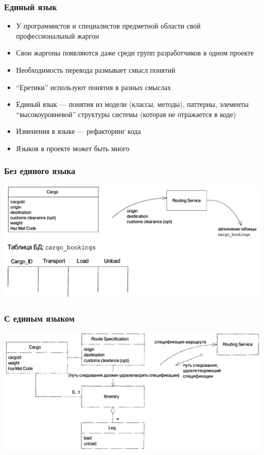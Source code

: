 \documentclass[xetex,mathserif,serif]{beamer}
\begin{document}
	\begin{frame}
		\frametitle{Единый язык}
		\begin{itemize}
			\item У программистов и специалистов предметной области свой профессиональный жаргон
			\item Свои жаргоны появляются даже среди групп разработчиков в одном проекте
			\item Необходимость перевода размывает смысл понятий
			\item ``Еретики'' используют понятия в разных смыслах
			\item Единый язык --- понятия из модели (классы, методы), паттерны, элементы ``высокоуровневой'' структуры системы (которая не отражается в коде)
			\item Изменения в языке --- рефакторинг кода
			\item Языков в проекте может быть много
		\end{itemize}
	\end{frame}

	\begin{frame}
		\frametitle{Без единого языка}
		\begin{center}
			\includegraphics[height=0.6\textheight]{lowAbstractionLanguage.png}
		\end{center}
	\end{frame}

	\begin{frame}
		\frametitle{С единым языком}
		\begin{center}
			\includegraphics[height=0.6\textheight]{highAbstractionLanguage.png}
		\end{center}
	\end{frame}
\end{document}
